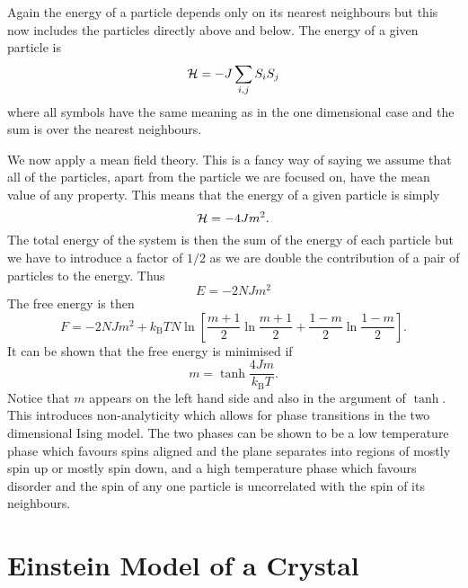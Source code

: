 \documentclass[a4paper]{article}
\newcommand{\boltzmann}{k_\mathrm{B}}
\begin{document}
    Again the energy of a particle depends only on its nearest neighbours but this now includes the particles directly above and below.
    The energy of a given particle is
    \[\mathcal{H} = -J\sum_{i,j} S_iS_j\]
    where all symbols have the same meaning as in the one dimensional case and the sum is over the nearest neighbours.
    
    We now apply a mean field theory.
    This is a fancy way of saying we assume that all of the particles, apart from the particle we are focused on, have the mean value of any property.
    This means that the energy of a given particle is simply
    \[\mathcal{H} = -4Jm^2.\]
    The total energy of the system is then the sum of the energy of each particle but we have to introduce a factor of \(1/2\) as we are double the contribution of a pair of particles to the energy.
    Thus
    \[E = -2NJm^2\]
    The free energy is then
    \[F = -2NJm^2 + \boltzmann TN \ln\left[\frac{m + 1}{2}\ln\frac{m + 1}{2} + \frac{1 - m}{2}\ln \frac{1 - m}{2}\right].\]
    It can be shown that the free energy is minimised if
    \[m = \tanh \frac{4Jm}{\boltzmann T}.\]
    Notice that \(m\) appears on the left hand side and also in the argument of \(\tanh\).
    This introduces non-analyticity which allows for phase transitions in the two dimensional Ising model.
    The two phases can be shown to be a low temperature phase which favours spins aligned and the plane separates into regions of mostly spin up or mostly spin down, and a high temperature phase which favours disorder and the spin of any one particle is uncorrelated with the spin of its neighbours.
    
    \section{Einstein Model of a Crystal}
\end{document}
